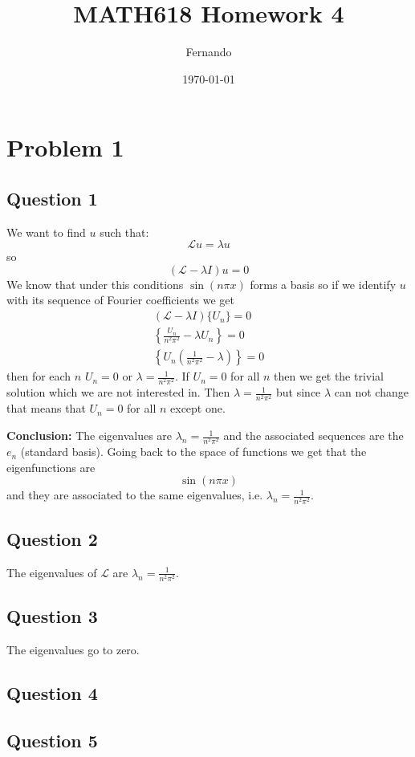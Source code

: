 \documentclass[12pt]{article}%
\begin{document}
\title{MATH618 Homework 4}
\author{Fernando}
\date{\today}
\maketitle
\section*{Problem 1}
\subsection*{Question 1}
We want to find $u$ such that:
\[
	\mathcal{L}u=\lambda u
\]
so
\[
	(\mathcal{L}-\lambda I) u=0
\]
We know that under this conditions $\sin(n\pi x)$ forms a basis so if we
identify $u$ with its sequence of Fourier coefficients we get
\begin{align*}
	(\mathcal{L}-\lambda I)\{U_n\}=0\\
	\left\{\frac{U_n}{n^2\pi^2}-\lambda U_n\right\}=0\\
	\left\{U_n\left(\frac{1}{n^2\pi^2}-\lambda\right)\right\}=0
\end{align*}
then for each $n$ $U_n=0$ or $\lambda=\frac{1}{n^2\pi^2}$. If $U_n=0$ for all
$n$ then we get the trivial solution which we are not interested in. Then
$\lambda = \frac{1}{n^2 \pi^2}$ but since $\lambda$ can not change that means
that $U_n=0$ for all $n$ except one.

\textbf{Conclusion:} The eigenvalues are $\lambda_n=\frac{1}{n^2\pi^2}$ and the
associated sequences are the $e_n$ (standard basis). Going back to the space of
functions we get that the eigenfunctions are
\[
	\sin(n\pi x)
\]
and they are associated to the same eigenvalues, i.e.
$\lambda_n=\frac{1}{n^2\pi^2}$.
\subsection*{Question 2}
The eigenvalues of $\mathcal{L}$ are $\lambda_n=\frac{1}{n^2\pi^2}$.
\subsection*{Question 3}
The eigenvalues go to zero.
\subsection*{Question 4}
\subsection*{Question 5}
\end{document}
